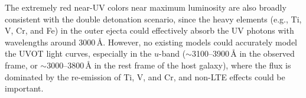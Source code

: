 \documentclass[twocolumn]{aastex631}
\begin{document}
\begin{CJK*}{UTF8}{gbsn}

The extremely red near-UV colors near maximum luminosity are also broadly consistent with the double detonation scenario, since the heavy elements (e.g., Ti, V, Cr, and Fe) in the outer ejecta could effectively absorb the UV photons with wavelengths around 3000\,\r{A}. %
However, no existing models could accurately model the UVOT light curves, especially in the $u$-band ($\sim$3100--3900\,\r{A} in the observed frame, or $\sim$3000--3800\,\r{A} in the rest frame of the host galaxy), where the flux is dominated by the re-emission of Ti, V, and Cr, and non-LTE effects could be important.


\end{CJK*}
\end{document}
